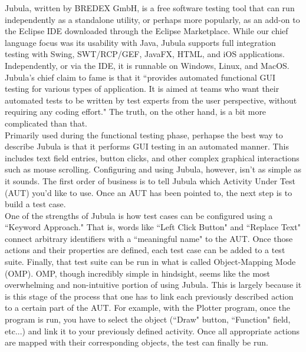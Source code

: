 \documentclass{article}
\begin{document}
Jubula, written by BREDEX GmbH, is a free software testing tool that can run independently as a standalone utility, or perhaps more popularly, as an add-on to the Eclipse IDE downloaded through the Eclipse Marketplace. While our chief language focus was its usability with Java, Jubula supports full integration testing with Swing, SWT/RCP/GEF, JavaFX, HTML, and iOS applications. Independently, or via the IDE, it is runnable on Windows, Linux, and MacOS. Jubula's chief claim to fame is that it ``provides automated functional GUI testing for various types of application. It is aimed at teams who want their automated tests to be written by test experts from the user perspective, without requiring any coding effort." The truth, on the other hand, is a bit more complicated than that. \\

Primarily used during the functional testing phase, perhapse the best way to describe Jubula is that it performs GUI testing in an automated manner. This includes text field entries, button clicks, and other complex graphical interactions such as mouse scrolling. Configuring and using Jubula, however, isn't as simple as it sounds. The first order of business is to tell Jubula which Activity Under Test (AUT) you'd like to use. Once an AUT has been pointed to, the next step is to build a test case.\\

One of the strengths of Jubula is how test cases can be configured using a ``Keyword Approach." That is, words like ``Left Click Button" and ``Replace Text" connect arbitrary identifiers with a ``meaningful name" to the AUT. Once those actions and their properties are defined, each test case can be added to a test suite. Finally, that test suite can be run in what is called Object-Mapping Mode (OMP). OMP, though incredibly simple in hindsight, seems like the most overwhelming and non-intuitive portion of using Jubula. This is largely because it is this stage of the process that one has to link each previously described action to a certain part of the AUT. For example, with the Plotter program, once the program is run, you have to select the object (``Draw" button, ``Function" field, etc...) and link it to your previously defined activity. Once all appropriate actions are mapped with their corresponding objects, the test can finally be run. \\
\end{document}
